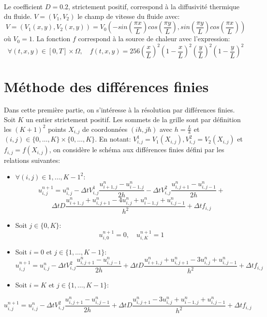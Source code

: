 \documentclass[
  11pt,
  dvipsnames]{article}
\begin{document}
Le coefficient \(D=0.2\), strictement positif, correspond à la diffusivité thermique du fluide. \(V = (V_1,V_2)\) le champ de vitesse du fluide avec:
\[ V = (V_1(x,y),V_2(x,y)) = V_0 (-sin(\frac{\pi x}{L})cos(\frac{\pi y}{L}),sin(\frac{\pi y}{L})cos(\frac{\pi x}{L}))\]
où \(V_0 = 1\). La fonction \(f\) correspond à la source de chaleur avec l'expression:
\[\forall(t,x,y) \in [0,T] \times \Omega, \quad f(t,x,y)=256(\frac{x}{L})^2 (1-\frac{x}{L})^2(\frac{y}{L})^2 (1-\frac{y}{L})^2\]

\hypertarget{muxe9thode-des-diffuxe9rences-finies}{%
\section{Méthode des différences finies}\label{muxe9thode-des-diffuxe9rences-finies}}

Dans cette première partie, on s'intéresse à la résolution par différences finies. Soit \(K\) un entier strictement positif. Les sommets de la grille sont par définition les \((K + 1)^2\) points \(X_{i,j}\) de coordonnées \((ih,jh)\) avec \(h =\frac{L}{k}\) et \((i,j) \in \{0,\dots,K\} \times \{0,\dots,K\}\). En notant: \(V_{i,j}^1=V_1(X_{i,j}),V_{i,j}^2=V_2(X_{i,j})\) et \(f_{i,j}=f(X_{i,j})\), on considère le schéma aux différences finies défini par les relations suivantes:

\begin{itemize}
\item
  \(\forall (i,j) \in {1,\dots,K-1}^2\):
  \[u_{i,j}^{n+1} = u_{i,j}^n-\Delta t V_{i,j}^1 \frac{u_{i+1,j}^{n}-u_{i-1,j}^{n}}{2h}-\Delta t V_{i,j}^2 \frac{u_{i,j+1}^{n}-u_{i,j-1}^{n}}{2h}+\]
  \[\Delta tD \frac{u_{i+1,j}^{n}+u_{i,j+1}^{n}-4u_{i,j}^{n}+u_{i-1,j}^{n}+u_{i,j-1}^{n}}{h^2}+\Delta t f_{i,j}\]
\item
  Soit \(j \in \{0,K\}\):
  \[ u_{i,0}^{n+1} = 0, \quad u_{i,K}^{n+1} = 1\]
\item
  Soit \(i = 0\) et \(j\in \{1,\dots,K-1\}\):
  \[u_{i,j}^{n+1} = u_{i,j}^n-\Delta t V_{i,j}^2 \frac{u_{i,j+1}^{n}-u_{i,j-1}^{n}}{2h}+ \Delta tD \frac{u_{i+1,j}^{n}+u_{i,j+1}^{n}-3u_{i,j}^{n}+u_{i,j-1}^{n}}{h^2} + \Delta t f_{i,j}\]
\item
  Soit \(i = K\) et \(j\in \{1,\dots,K-1\}\):
\end{itemize}

\[u_{i,j}^{n+1} = u_{i,j}^n-\Delta t V_{i,j}^2 \frac{u_{i,j+1}^{n}-u_{i,j-1}^{n}}{2h} + \Delta tD \frac{u_{i,j+1}^{n}-3u_{i,j}^{n}+u_{i-1,j}^{n}+u_{i,j-1}^{n}}{h^2} + \Delta t f_{i,j}\]
\end{document}
